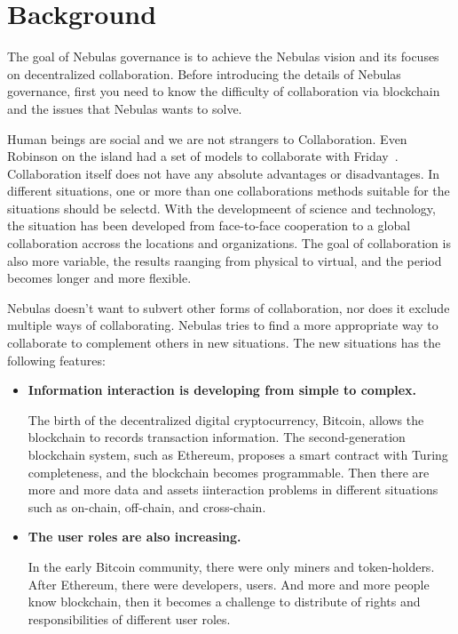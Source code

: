 \section{Background}

The goal of Nebulas governance is to achieve the Nebulas vision and its focuses on decentralized collaboration. Before introducing the details of Nebulas governance, first you need to know the difficulty of collaboration via blockchain and the issues that Nebulas wants to solve.

\label{background}

Human beings are social and we are not strangers to Collaboration. Even Robinson on the island had a set of models to collaborate with Friday~\cite{robinson}. Collaboration itself does not have any absolute advantages or disadvantages. In different situations, one or more than one collaborations methods suitable for the situations should be selectd. With the developmeent of science and technology, the situation has been developed from face-to-face cooperation to a global collaboration accross the locations and organizations. The goal of collaboration is also more variable, the results raanging from physical to virtual, and the period becomes longer and more flexible.

Nebulas doesn't want to subvert other forms of collaboration, nor does it exclude multiple ways of collaborating. Nebulas tries to find a more appropriate way to collaborate to complement others in new situations. The new situations has the following features:

\begin{itemize}
	\item \textbf{Information interaction is developing from simple to complex.}

	The birth of the decentralized digital cryptocurrency, Bitcoin, allows the blockchain to records transaction information. The second-generation blockchain system, such as Ethereum, proposes a smart contract with Turing completeness, and the blockchain becomes programmable. Then there are more and more data and assets iinteraction problems in different situations such as on-chain, off-chain, and cross-chain.

	\item \textbf{The user roles are also increasing.}

	In the early Bitcoin community, there were only miners and token-holders. After Ethereum, there were developers, users. And more and more people know blockchain, then it becomes a challenge to distribute of rights and responsibilities of different user roles.

\end{itemize}

